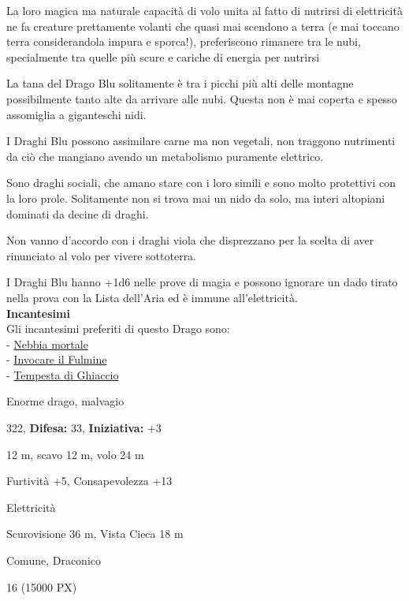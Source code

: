 \begin{multicols}{2}
{La loro magica ma naturale capacità di volo unita al fatto di nutrirsi di elettricità ne fa creature prettamente volanti che quasi mai scendono a terra (e mai toccano terra considerandola impura e sporca!), preferiscono rimanere tra le nubi, specialmente tra quelle più scure e cariche di energia per nutrirsi

La tana del Drago Blu solitamente è tra i picchi più alti delle montagne possibilmente tanto alte da arrivare alle nubi. Questa non è mai coperta e spesso assomiglia a giganteschi nidi.

I Draghi Blu possono assimilare carne ma non vegetali, non traggono nutrimenti da ciò che mangiano avendo un metabolismo puramente elettrico.

Sono draghi sociali, che amano stare con i loro simili e sono molto protettivi con la loro prole.
Solitamente non si trova mai un nido da solo, ma interi altopiani dominati da decine di draghi.

Non vanno d'accordo con i draghi viola che disprezzano per la scelta di aver rinunciato al volo per vivere sottoterra.

I Draghi Blu hanno +1d6 nelle prove di magia e possono ignorare un dado tirato nella prova con la Lista dell'Aria ed è immune all'elettricità.\\
\textbf{Incantesimi}\\
Gli incantesimi preferiti di questo Drago sono:\\
- \hyperlink{Nebbia mortale}{Nebbia mortale}\\
- \hyperlink{Invocare il Fulmine}{Invocare il Fulmine}\\
- \hyperlink{Tempesta di Ghiaccio}{Tempesta di Ghiaccio}

\noindent
\begin{description}[noitemsep, topsep=0pt, parsep=0pt, partopsep=0pt, leftmargin=0cm, labelwidth=2.2cm]
	\item[\textbf{Taglia/Tipo:}] Enorme drago, malvagio
	\item[\textbf{Caratt.:}] 
	\item[\textbf{Punti Ferita:}] 322,  \textbf{Difesa:} 33,  \textbf{Iniziativa:} +3
	\item[\textbf{Movimento:}] 12 m, scavo 12 m, volo 24 m
	\item[\textbf{Tiri Salvez.:}] 
	\item[\textbf{Comp.:}] Furtività +5, Consapevolezza +13
	\item[\textbf{Imm. Danni:}] Elettricità
	\item[\textbf{Sensi:}] Scurovisione 36 m, Vista Cieca 18 m
	\item[\textbf{Linguaggi:}] Comune, Draconico
	\item[\textbf{Sfida:}] 16 (15000 PX)\smallskip
\end{description}

}
\end{multicols}

